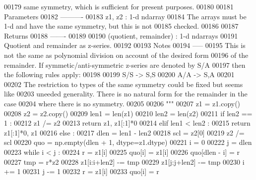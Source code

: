 \begin{DoxyCode}
00179 \textcolor{stringliteral}{    same symmetry, which is sufficient for present purposes.}
00180 \textcolor{stringliteral}{}
00181 \textcolor{stringliteral}{    Parameters}
00182 \textcolor{stringliteral}{    ----------}
00183 \textcolor{stringliteral}{    z1, z2 : 1-d ndarray}
00184 \textcolor{stringliteral}{        The arrays must be 1-d and have the same symmetry, but this is not}
00185 \textcolor{stringliteral}{        checked.}
00186 \textcolor{stringliteral}{}
00187 \textcolor{stringliteral}{    Returns}
00188 \textcolor{stringliteral}{    -------}
00189 \textcolor{stringliteral}{}
00190 \textcolor{stringliteral}{    (quotient, remainder) : 1-d ndarrays}
00191 \textcolor{stringliteral}{        Quotient and remainder as z-series.}
00192 \textcolor{stringliteral}{}
00193 \textcolor{stringliteral}{    Notes}
00194 \textcolor{stringliteral}{    -----}
00195 \textcolor{stringliteral}{    This is not the same as polynomial division on account of the desired form}
00196 \textcolor{stringliteral}{    of the remainder. If symmetic/anti-symmetric z-series are denoted by S/A}
00197 \textcolor{stringliteral}{    then the following rules apply:}
00198 \textcolor{stringliteral}{}
00199 \textcolor{stringliteral}{    S/S -> S,S}
00200 \textcolor{stringliteral}{    A/A -> S,A}
00201 \textcolor{stringliteral}{}
00202 \textcolor{stringliteral}{    The restriction to types of the same symmetry could be fixed but seems like}
00203 \textcolor{stringliteral}{    uneeded generality. There is no natural form for the remainder in the case}
00204 \textcolor{stringliteral}{    where there is no symmetry.}
00205 \textcolor{stringliteral}{}
00206 \textcolor{stringliteral}{    """}
00207     z1 = z1.copy()
00208     z2 = z2.copy()
00209     len1 = len(z1)
00210     len2 = len(z2)
00211     \textcolor{keywordflow}{if} len2 == 1 :
00212         z1 /= z2
00213         \textcolor{keywordflow}{return} z1, z1[:1]*0
00214     \textcolor{keywordflow}{elif} len1 < len2 :
00215         \textcolor{keywordflow}{return} z1[:1]*0, z1
00216     \textcolor{keywordflow}{else} :
00217         dlen = len1 - len2
00218         scl = z2[0]
00219         z2 /= scl
00220         quo = np.empty(dlen + 1, dtype=z1.dtype)
00221         i = 0
00222         j = dlen
00223         \textcolor{keywordflow}{while} i < j :
00224             r = z1[i]
00225             quo[i] = z1[i]
00226             quo[dlen - i] = r
00227             tmp = r*z2
00228             z1[i:i+len2] -= tmp
00229             z1[j:j+len2] -= tmp
00230             i += 1
00231             j -= 1
00232         r = z1[i]
00233         quo[i] = r

\end{DoxyCode}

